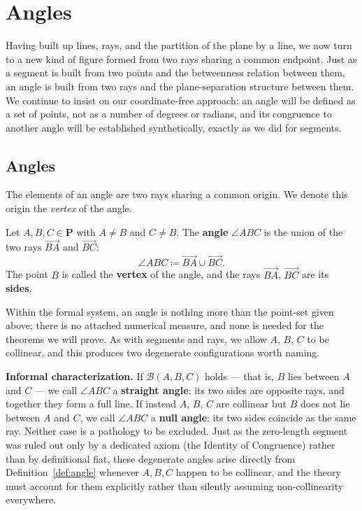 \documentclass[../../../main/main.tex]{subfiles}
\begin{document}
\chapter{Angles}

Having built up lines, rays, and the partition of the plane by a line, we now turn to a new kind of figure formed from two rays sharing a common endpoint. Just as a segment is built from two points and the betweenness relation between them, an angle is built from two rays and the plane-separation structure between them. We continue to insist on our coordinate-free approach: an angle will be defined as a set of points, not as a number of degrees or radians, and its congruence to another angle will be established synthetically, exactly as we did for segments.

\section{Angles}

The elements of an angle are two rays sharing a common origin. We denote this origin the \textit{vertex} of the angle.

\begin{definition}[Angle]\label{def:angle}
Let $A, B, C \in \mathbf{P}$ with $A \neq B$ and $C \neq B$. The \textbf{angle} $\angle ABC$ is the union of the two rays $\overrightarrow{BA}$ and $\overrightarrow{BC}$:
\[
\angle ABC \coloneqq \overrightarrow{BA} \cup \overrightarrow{BC}.
\]
The point $B$ is called the \textbf{vertex} of the angle, and the rays $\overrightarrow{BA}$, $\overrightarrow{BC}$ are its \textbf{sides}.
\end{definition}

Within the formal system, an angle is nothing more than the point-set given above; there is no attached numerical measure, and none is needed for the theorems we will prove. As with segments and rays, we allow $A$, $B$, $C$ to be collinear, and this produces two degenerate configurations worth naming.

\medskip
\noindent\textbf{Informal characterization.} If $\mathcal{B}(A,B,C)$ holds --- that is, $B$ lies between $A$ and $C$ --- we call $\angle ABC$ a \textbf{straight angle}: its two sides are opposite rays, and together they form a full line. If instead $A$, $B$, $C$ are collinear but $B$ does not lie between $A$ and $C$, we call $\angle ABC$ a \textbf{null angle}: its two sides coincide as the same ray. Neither case is a pathology to be excluded. Just as the zero-length segment was ruled out only by a dedicated axiom (the Identity of Congruence) rather than by definitional fiat, these degenerate angles arise directly from Definition~\ref{def:angle} whenever $A,B,C$ happen to be collinear, and the theory must account for them explicitly rather than silently assuming non-collinearity everywhere.
\end{document}

